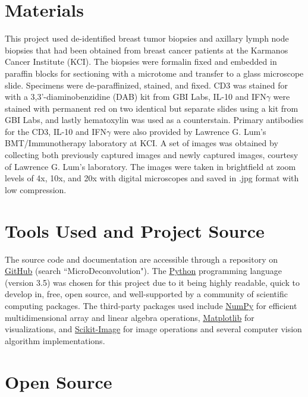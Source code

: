 \documentclass[12pt]{article}
\begin{document}
\section*{Materials}

This project used de-identified breast tumor biopsies and axillary lymph node biopsies that had been obtained from breast cancer patients at the Karmanos Cancer Institute (KCI). The biopsies were formalin fixed and embedded in paraffin blocks for sectioning with a microtome and transfer to a glass microscope slide. Specimens were de-paraffinized, stained, and fixed. CD3 was stained for with a 3,3'-diaminobenzidine (DAB) kit from GBI Labs, IL-10 and IFN$\gamma$ were stained with permanent red on two identical but separate slides using a kit from GBI Labs, and lastly hematoxylin was used as a counterstain. Primary antibodies for the CD3, IL-10 and IFN$\gamma$ were also provided by Lawrence G. Lum's BMT/Immunotherapy laboratory at KCI. A set of images was obtained by collecting both previously captured images and newly captured images, courtesy of Lawrence G. Lum's laboratory. The images were taken in brightfield at zoom levels of 4x, 10x, and 20x with digital microscopes and saved in .jpg format with low compression.


\section*{Tools Used and Project Source}

The source code and documentation are accessible through a repository on \href{https://github.com/griffincalme/MicroDeconvolution}{GitHub} (search ``MicroDeconvolution"). The \href{https://www.python.org/}{Python} programming language (version 3.5) was chosen for this project due to it being highly readable, quick to develop in, free, open source, and well-supported by a community of scientific computing packages. The third-party packages used include \href{http://www.numpy.org/}{NumPy} for efficient multidimensional array and linear algebra operations, \href{http://matplotlib.org/}{Matplotlib} for visualizations, and  \href{http://scikit-image.org/}{Scikit-Image} for image operations and several computer vision algorithm implementations.  


\section*{Open Source}
\end{document}

